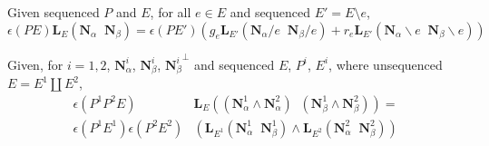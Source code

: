 \documentclass[Unicode]{cedram-alco}
\newcommand{\ext}[1]{\ensuremath{\mathbf{#1}}}
\newcommand{\eNal}{\ensuremath{\ext{N}_{\alpha}}}
\newcommand{\eNbe}{\ensuremath{\ext{N}_\beta}}
\newcommand{\dunion}{\coprod}
\newcommand{\extLHorSub}[3]{\ext{L}_{#1}\left(  {#2}\;\; {#3}  \right)}
\newcommand{\LHorSub}[3]{\ext{L}_{#1}\left(  {#2}\;\; {#3}  \right)}
\begin{document}
\begin{theo}
  Given sequenced $P$ and $E$, for all $e\in E$ and sequenced $E'=E\setminus e$,
  \begin{equation}\label{delecontrequation}
     \epsilon(PE)\extLHorSub{E}{\eNal}{\eNbe}=
      \epsilon(PE')
      \left(
      g_e\extLHorSub{E'}{\eNal/e}{\eNbe/e} +
      r_e\extLHorSub{E'}{\eNal\backslash e}{\eNbe\backslash e}\right)
  \end{equation}

  Given, for $i = 1, 2$,
  $\ext{N}_\alpha^{i}$,  $\ext{N}_\beta^{i}$, ${\ext{N}_\beta^{i}}^\perp$ 
  and
  sequenced $E$, $P^{i}$, $E^{i}$, where unsequenced $E=E^{1}\dunion E^{2}$,
  \begin{equation}\label{productequation}
    \begin{split}
    \epsilon(P^1P^2E)
    &\LHorSub{E}
            {(\ext{N}_\alpha^{1}\wedge\ext{N}_\alpha^{2})}
            {(\ext{N}_\beta^{1}\wedge\ext{N}_\beta^{2})}
    = \\
    \epsilon(P^{1}E^{1})
    \epsilon(P^{2}E^{2}) 
        &\left(\LHorSub{E^{1}}{\ext{N}_\alpha^{1}}{\ext{N}_\beta^{1}}
        \wedge
        \LHorSub{E^{2}}{\ext{N}_\alpha^{2}}{\ext{N}_\beta^{2}}
          \right)
    \end{split}
  \end{equation}

\end{theo}
  
\end{document}
